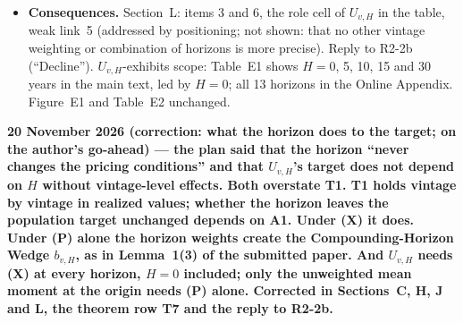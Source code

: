 \documentclass[11pt]{article}
\begin{document}
\begin{itemize}
\item \textbf{Consequences.} Section~L: items 3 and 6, the role cell of $U_{v,H}$ in the table, weak link~5 (addressed by positioning; not shown: that no other vintage weighting or combination of horizons is more precise). Reply to R2-2b (``Decline''). $U_{v,H}$-exhibits scope: Table~E1 shows $H=0$, 5, 10, 15 and 30 years in the main text, led by $H=0$; all 13 horizons in the Online Appendix. Figure~E1 and Table~E2 unchanged.
\end{itemize}

\textbf{20 November 2026 (correction: what the horizon does to the target; on the author's go-ahead) --- the plan said that the horizon ``never changes the pricing conditions'' and that $U_{v,H}$'s target does not depend on $H$ without vintage-level effects. Both overstate T1. T1 holds vintage by vintage in realized values; whether the horizon leaves the population target unchanged depends on A1. Under (X) it does. Under (P) alone the horizon weights create the Compounding-Horizon Wedge $b_{v,H}$, as in Lemma~1(3) of the submitted paper. And $U_{v,H}$ needs (X) at every horizon, $H=0$ included; only the unweighted mean moment at the origin needs (P) alone. Corrected in Sections~C, H, J and L, the theorem row T7 and the reply to R2-2b.}
\end{document}
